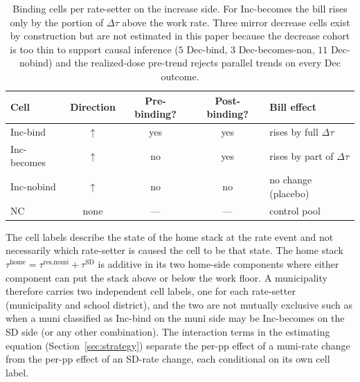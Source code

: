 \documentclass[12pt]{article}
\begin{document}
\begin{table}[H]
\centering
\small
\begin{tabular}{lcccl}
\toprule
Cell & Direction & Pre-binding? & Post-binding? & Bill effect \\
\midrule
Inc-bind         & $\uparrow$  & yes & yes & rises by full $\Delta\tau$ \\
Inc-becomes      & $\uparrow$  & no  & yes & rises by part of $\Delta\tau$ \\
Inc-nobind       & $\uparrow$  & no  & no  & no change (placebo) \\
NC               & none & --- & --- & control pool \\
\bottomrule
\end{tabular}
\caption{Binding cells per rate-setter on the increase side. For Inc-becomes the bill rises only by the portion of $\Delta\tau$ above the work rate. Three mirror decrease cells exist by construction but are not estimated in this paper because the decrease cohort is too thin to support causal inference ($5$ Dec-bind, $3$ Dec-becomes-non, $11$ Dec-nobind) and the realized-dose pre-trend rejects parallel trends on every Dec outcome.}
\label{tab:cells}
\end{table}

The cell labels describe the state of the home stack at the
rate event and not necessarily which rate-setter is caused the cell to be that state.
The home stack $\tau^{\text{home}} = \tau^{\text{res,muni}} + \tau^{\text{SD}}$ is
additive in its two home-side components where either component can put
the stack above or below the work floor. A municipality
therefore carries two independent cell labels, one for each
rate-setter (municipality and school district), and the two are not mutually exclusive such as when a muni
classified as Inc-bind on the muni side may be Inc-becomes on the
SD side (or any other combination). The interaction terms in the
estimating equation (Section~\ref{sec:strategy}) separate the
per-pp effect of a muni-rate change from the per-pp effect of an
SD-rate change, each conditional on its own cell label.
\end{document}

